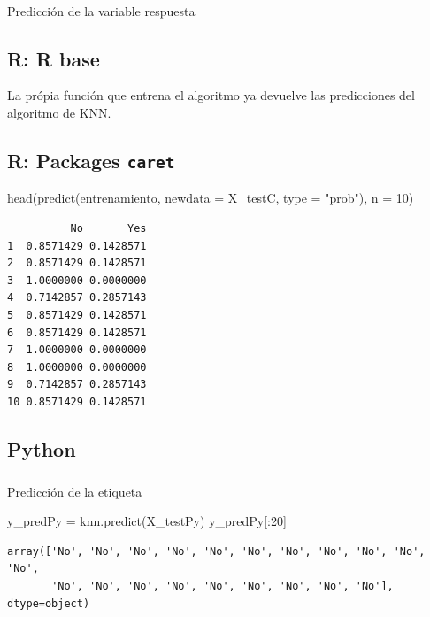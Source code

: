 \documentclass[
  letterpaper,
  DIV=11,
  numbers=noendperiod]{scrartcl}
\makeatletter
\let\oldparagraph\paragraph
\renewcommand{\paragraph}{
    \@ifstar
      \xxxParagraphStar
      \xxxParagraphNoStar
  }
\newcommand{\xxxParagraphStar}[1]{\oldparagraph*{#1}\mbox{}}
\newcommand{\xxxParagraphNoStar}[1]{\oldparagraph{#1}\mbox{}}
\let\oldsubparagraph\subparagraph
\renewcommand{\subparagraph}{
    \@ifstar
      \xxxSubParagraphStar
      \xxxSubParagraphNoStar
  }
\newcommand{\xxxSubParagraphStar}[1]{\oldsubparagraph*{#1}\mbox{}}
\newcommand{\xxxSubParagraphNoStar}[1]{\oldsubparagraph{#1}\mbox{}}
\newenvironment{Shaded}{\begin{snugshade}}{\end{snugshade}}
\newcommand{\AttributeTok}[1]{\textcolor[rgb]{0.40,0.45,0.13}{#1}}
\newcommand{\DecValTok}[1]{\textcolor[rgb]{0.68,0.00,0.00}{#1}}
\newcommand{\FunctionTok}[1]{\textcolor[rgb]{0.28,0.35,0.67}{#1}}
\newcommand{\NormalTok}[1]{\textcolor[rgb]{0.00,0.23,0.31}{#1}}
\newcommand{\OperatorTok}[1]{\textcolor[rgb]{0.37,0.37,0.37}{#1}}
\newcommand{\StringTok}[1]{\textcolor[rgb]{0.13,0.47,0.30}{#1}}
\makeatother
\begin{document}
\paragraph{Predicción de la variable
respuesta}\label{predicciuxf3n-de-la-variable-respuesta}

\subsection{R: R base}

La própia función que entrena el algoritmo ya devuelve las predicciones
del algoritmo de KNN.

\subsection{\texorpdfstring{R: Packages
\texttt{caret}}{R: Packages caret}}

\begin{Shaded}
\begin{Highlighting}[]
\FunctionTok{head}\NormalTok{(}\FunctionTok{predict}\NormalTok{(entrenamiento, }\AttributeTok{newdata =}\NormalTok{ X\_testC, }\AttributeTok{type =} \StringTok{"prob"}\NormalTok{), }\AttributeTok{n =} \DecValTok{10}\NormalTok{)}
\end{Highlighting}
\end{Shaded}

\begin{verbatim}
          No       Yes
1  0.8571429 0.1428571
2  0.8571429 0.1428571
3  1.0000000 0.0000000
4  0.7142857 0.2857143
5  0.8571429 0.1428571
6  0.8571429 0.1428571
7  1.0000000 0.0000000
8  1.0000000 0.0000000
9  0.7142857 0.2857143
10 0.8571429 0.1428571
\end{verbatim}

\subsection{Python}

\subparagraph{Predicción de la
etiqueta}\label{predicciuxf3n-de-la-etiqueta}

\begin{Shaded}
\begin{Highlighting}[]
\NormalTok{y\_predPy }\OperatorTok{=}\NormalTok{ knn.predict(X\_testPy)}
\NormalTok{y\_predPy[:}\DecValTok{20}\NormalTok{]}
\end{Highlighting}
\end{Shaded}

\begin{verbatim}
array(['No', 'No', 'No', 'No', 'No', 'No', 'No', 'No', 'No', 'No', 'No',
       'No', 'No', 'No', 'No', 'No', 'No', 'No', 'No', 'No'], dtype=object)
\end{verbatim}
\end{document}
